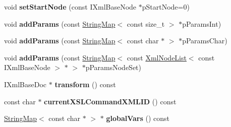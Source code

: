\begin{DoxyCompactItemize}
\item 
\hypertarget{classgeneral__server_1_1LibXslTransformContext_a2d3cd303184fa52c6e09e9e82b37a113}{void {\bfseries set\-Start\-Node} (const \-I\-Xml\-Base\-Node $\ast$p\-Start\-Node=0)}\label{classgeneral__server_1_1LibXslTransformContext_a2d3cd303184fa52c6e09e9e82b37a113}

\item 
\hypertarget{classgeneral__server_1_1LibXslTransformContext_ad2cbf3ae529ec58bc06b4f4cc9978a75}{void {\bfseries add\-Params} (const \hyperlink{classgeneral__server_1_1StringMap}{\-String\-Map}$<$ const size\-\_\-t $>$ $\ast$p\-Params\-Int)}\label{classgeneral__server_1_1LibXslTransformContext_ad2cbf3ae529ec58bc06b4f4cc9978a75}

\item 
\hypertarget{classgeneral__server_1_1LibXslTransformContext_a13b62cd0c35eedf90e651e35856326b3}{void {\bfseries add\-Params} (const \hyperlink{classgeneral__server_1_1StringMap}{\-String\-Map}$<$ const char $\ast$ $>$ $\ast$p\-Params\-Char)}\label{classgeneral__server_1_1LibXslTransformContext_a13b62cd0c35eedf90e651e35856326b3}

\item 
\hypertarget{classgeneral__server_1_1LibXslTransformContext_aba28004d1bca96e2f0e8cfc10a468ef5}{void {\bfseries add\-Params} (const \hyperlink{classgeneral__server_1_1StringMap}{\-String\-Map}$<$ const \hyperlink{classgeneral__server_1_1XmlNodeList}{\-Xml\-Node\-List}$<$ const \-I\-Xml\-Base\-Node $>$ $\ast$ $>$ $\ast$p\-Params\-Node\-Set)}\label{classgeneral__server_1_1LibXslTransformContext_aba28004d1bca96e2f0e8cfc10a468ef5}

\item 
\hypertarget{classgeneral__server_1_1LibXslTransformContext_a273dc07a39d28b16c165ea798bf817fa}{\-I\-Xml\-Base\-Doc $\ast$ {\bfseries transform} () const }\label{classgeneral__server_1_1LibXslTransformContext_a273dc07a39d28b16c165ea798bf817fa}

\item 
\hypertarget{classgeneral__server_1_1LibXslTransformContext_a1253ef24283323bfbae357583ce8c414}{const char $\ast$ {\bfseries current\-X\-S\-L\-Command\-X\-M\-L\-I\-D} () const }\label{classgeneral__server_1_1LibXslTransformContext_a1253ef24283323bfbae357583ce8c414}

\item 
\hypertarget{classgeneral__server_1_1LibXslTransformContext_ac45b531d059b768728c73aae531975f0}{\hyperlink{classgeneral__server_1_1StringMap}{\-String\-Map}$<$ const char $\ast$ $>$ $\ast$ {\bfseries global\-Vars} () const }\label{classgeneral__server_1_1LibXslTransformContext_ac45b531d059b768728c73aae531975f0}


\end{DoxyCompactItemize}
